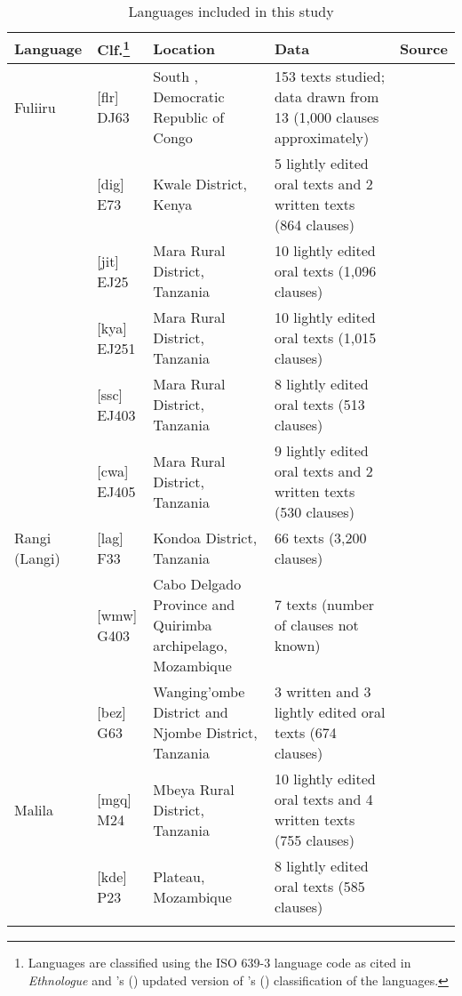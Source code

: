 \documentclass[output=paper]{langsci/langscibook}
\begin{document}
\begin{table}
\small
\begin{tabularx}{\textwidth}{p{1.5cm}p{1cm}QQp{2cm}}
\lsptoprule
Language & Clf.\footnote{Languages are classified using the ISO 639-3 language code as cited in \textit{Ethnologue} \citep{lewisetal2015} and \citeauthor{maho2003}’s (\citeyear{maho2003}) updated version of \citeauthor{guthrie1967}’s (\citeyear{guthrie1967}) classification of the  languages.}
			    & Location & Data & Source\\
\midrule
Fuliiru & [flr] DJ63 & South , Democratic Republic of Congo & 153 texts studied; data drawn from 13 (1,000 clauses approximately) & \citet{vanotterloo2011,vanotterloo2015}\\
  & [dig] E73 & Kwale District, Kenya & 5 lightly edited oral texts and 2 written texts (864 clauses) & \citet{nicolle2015a}\\
  & [jit] EJ25 & Mara Rural District, Tanzania & 10 lightly edited oral texts (1,096 clauses) & \citet{pylerobinson2015}\\
  & [kya] EJ251 & Mara Rural District, Tanzania & 10 lightly edited oral texts (1,015 clauses) & \citet{odom2015}\\
  & [ssc] EJ403 & Mara Rural District, Tanzania & 8 lightly edited oral texts (513 clauses) & \citet{masatu2015}\\
  & [cwa] EJ405 & Mara Rural District, Tanzania & 9 lightly edited oral texts and 2 written texts (530 clauses) & \citet{walker2011}\\
 Rangi (Langi) & [lag] F33 & Kondoa District, Tanzania & 66 texts (3,200 clauses) & \citet{Stegen2011}\\
  & [wmw] G403 & Cabo Delgado Province and Quirimba archipelago, Mozambique & 7 texts (number of clauses not known) & \citet{floor2005}\\
  & [bez] G63 & Wanging’ombe District and Njombe District, Tanzania & 3 written and 3 lightly edited oral texts (674 clauses) & \citet{broomhall2011,eaton2015a}\\
 Malila & [mgq] M24 & Mbeya Rural District, Tanzania & 10 lightly edited oral texts and 4 written texts (755 clauses) & \citet{eaton2015b}\\
  & [kde] P23 &  Plateau, Mozambique & 8 lightly edited oral texts (585 clauses) & \citet{leach2015}\\

\lspbottomrule
\end{tabularx}

\caption{Languages included in this study}	
\label{tab:1.nicolle}
\end{table}
\end{document}
